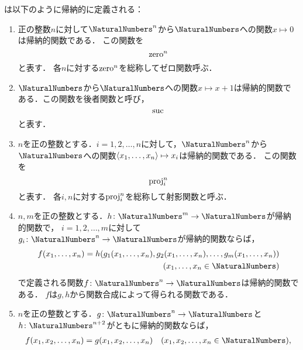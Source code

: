 \begin{Def} \label{Def:recursivefunction}
	は以下のように帰納的に定義される：
	\begin{enumerate}
		\item 正の整数\(n\)に対して\(\NaturalNumbers^n\)から\(\NaturalNumbers\)への関数\(x \mapsto 0\)は帰納的関数である．
		      この関数を
		      \begin{equation}
			      \operatorname{zero}^n
			      \label{eq:zerofunction}
		      \end{equation}
		      と表す．
		      各\(n\)に対する\(\operatorname{zero}^n\)を総称してゼロ関数呼ぶ．
		\item \(\NaturalNumbers\)から\(\NaturalNumbers\)への関数\(x \mapsto x + 1\)は帰納的関数である．この関数を後者関数と呼び，
		      \begin{equation}
			      \operatorname{suc}
			      \label{eq:sucfunction}
		      \end{equation}
		      と表す．
		\item \(n\)を正の整数とする．\(i=1,2,\dots, n\)に対して，\(\NaturalNumbers^n\)から\(\NaturalNumbers\)への関数\(\langle x_1, \dots, x_n \rangle \mapsto x_i\)は帰納的関数である．
		      この関数を
		      \begin{equation}
			      \operatorname{proj}_i^n
		      \end{equation}
		      と表す．
		      各\(i, n\)に対する\(\operatorname{proj}_i^n\)を総称して射影関数と呼ぶ．
		\item \(n,m\)を正の整数とする．\(h \colon \NaturalNumbers^m \to \NaturalNumbers\)が帰納的関数で，
		      \(i = 1,2,\dots,m\)に対して\(g_i \colon \NaturalNumbers^n \to \NaturalNumbers\)が帰納的関数ならば，
		      \begin{align*}
			      \apply{f}{x_1, \dots, x_n} = \apply{h}{
				      \apply{g_1}{x_1, \dots, x_n},
				      \apply{g_2}{x_1, \dots, x_n},
				      \dots,
				      \apply{g_m}{x_1, \dots, x_n}
			      } \\
			      \text{(\(x_1, \dots, x_n \in \NaturalNumbers\))}
		      \end{align*}
		      で定義される関数\(f \colon \NaturalNumbers^n \to \NaturalNumbers\)は帰納的関数である．
		      \(f\)は\(g, h\)から関数合成によって得られる関数である．
		\item \(n\)を正の整数とする．\(g \colon \NaturalNumbers^n \to \NaturalNumbers\)と\(h \colon \NaturalNumbers^{n+2}\)がともに帰納的関数ならば，
		      \begin{align*}
			      \apply{f}{x_1, x_2, \dots, x_n}        & = \apply{g}{x_1, x_2, \dots, x_n} \quad \text{(\(x_1, x_2, \dots, x_n \in \NaturalNumbers\))}, \\

\end{align*}
\end{enumerate}
\end{Def}
